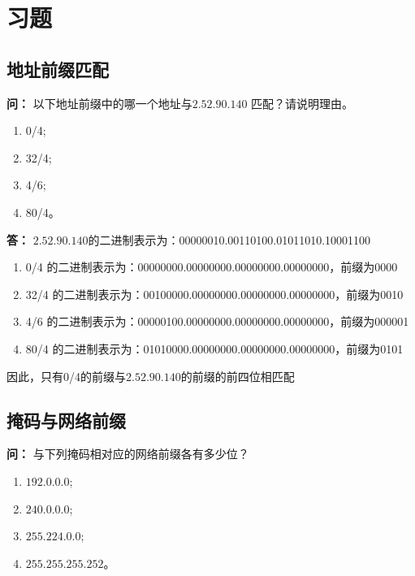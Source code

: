 \documentclass[12pt,hyperref,a4paper,UTF8]{ctexart}
\begin{document}
\cover
\thispagestyle{empty}%


\newpage
\tableofcontents

\newpage
\section{习题}

\subsection{地址前缀匹配}
\textbf{问：}
以下地址前缀中的哪一个地址与$2.52.90.140$ 匹配？请说明理由。
\begin{enumerate}[label=\Roman*),leftmargin=2.2\parindent]
    \item 0/4; 
    \item 32/4; 
    \item 4/6; 
    \item 80/4。
\end{enumerate}

\textbf{答：}
$2.52.90.140$的二进制表示为：00000010.00110100.01011010.10001100
\begin{enumerate}
    \item 0/4 的二进制表示为：00000000.00000000.00000000.00000000，前缀为0000
    \item 32/4 的二进制表示为：00100000.00000000.00000000.00000000，前缀为0010
    \item 4/6 的二进制表示为：00000100.00000000.00000000.00000000，前缀为000001
    \item 80/4 的二进制表示为：01010000.00000000.00000000.00000000，前缀为0101
\end{enumerate}
因此，只有0/4的前缀与$2.52.90.140$的前缀的前四位相匹配


\subsection{掩码与网络前缀}
\textbf{问：}
与下列掩码相对应的网络前缀各有多少位？
\begin{enumerate}[label=\Roman*),leftmargin=2.2\parindent]
    \item $192.0.0.0$;
    \item $240.0.0.0$;
    \item $255.224.0.0$;
    \item $255.255.255.252$。 
\end{enumerate}
\end{document}
